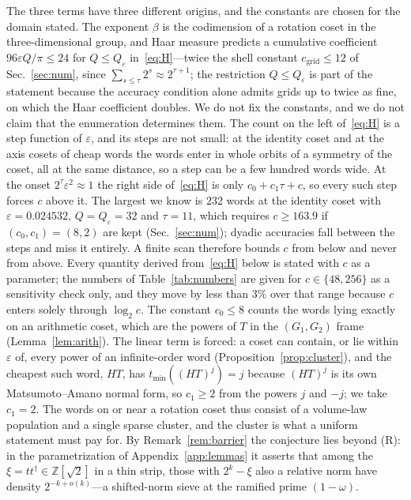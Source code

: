 \documentclass[aps,prx,twocolumn,superscriptaddress,nofootinbib,longbibliography]{revtex4-2}
\theoremstyle{plain}
\theoremstyle{definition}
\theoremstyle{remark}
\newcommand{\Z}{\mathbb{Z}}
\begin{document}
The three terms have three different origins, and the constants are chosen for the domain stated. The exponent $\beta$ is the codimension of a rotation coset in the three-dimensional group, and Haar measure predicts a cumulative coefficient $96\varepsilon Q/\pi\le24$ for $Q\le Q_\varepsilon$ in~\eqref{eq:H}---twice the shell constant $c_{\mathrm{grid}}\le12$ of Sec.~\ref{sec:num}, since $\sum_{s\le\tau}2^s\approx2^{\tau+1}$; the restriction $Q\le Q_\varepsilon$ is part of the statement because the accuracy condition alone admits grids up to twice as fine, on which the Haar coefficient doubles. We do not fix the constants, and we do not claim that the enumeration determines them. The count on the left of~\eqref{eq:H} is a step function of $\varepsilon$, and its steps are not small: at the identity coset and at the axis cosets of cheap words the words enter in whole orbits of a symmetry of the coset, all at the same distance, so a step can be a few hundred words wide. At the onset $2^\tau\varepsilon^2\approx1$ the right side of~\eqref{eq:H} is only $c_0+c_1\tau+c$, so every such step forces $c$ above it. The largest we know is $232$ words at the identity coset with $\varepsilon=0.024532$, $Q=Q_\varepsilon=32$ and $\tau=11$, which requires $c\ge163.9$ if $(c_0,c_1)=(8,2)$ are kept (Sec.~\ref{sec:num}); dyadic accuracies fall between the steps and miss it entirely. A finite scan therefore bounds $c$ from below and never from above. Every quantity derived from~\eqref{eq:H} below is stated with $c$ as a parameter; the numbers of Table~\ref{tab:numbers} are given for $c\in\{48,256\}$ as a sensitivity check only, and they move by less than $3\%$ over that range because $c$ enters solely through $\log_2c$. The constant $c_0\le8$ counts the words lying exactly on an arithmetic coset, which are the powers of $T$ in the $(G_1,G_2)$ frame (Lemma~\ref{lem:arith}). The linear term is forced: a coset can contain, or lie within $\varepsilon$ of, every power of an infinite-order word (Proposition~\ref{prop:cluster}), and the cheapest such word, $HT$, has $t_{\min}((HT)^{j})=j$ because $(HT)^j$ is its own Matsumoto--Amano normal form, so $c_1\ge2$ from the powers $j$ and $-j$; we take $c_1=2$. The words on or near a rotation coset thus consist of a volume-law population and a single sparse cluster, and the cluster is what a uniform statement must pay for. By Remark~\ref{rem:barrier} the conjecture lies beyond (R): in the parametrization of Appendix~\ref{app:lemmas} it asserts that among the $\xi=tt^\dagger\in\Z[\sqrt2]$ in a thin strip, those with $2^k-\xi$ also a relative norm have density $2^{-k+o(k)}$---a shifted-norm sieve at the ramified prime $(1-\omega)$.
\end{document}
